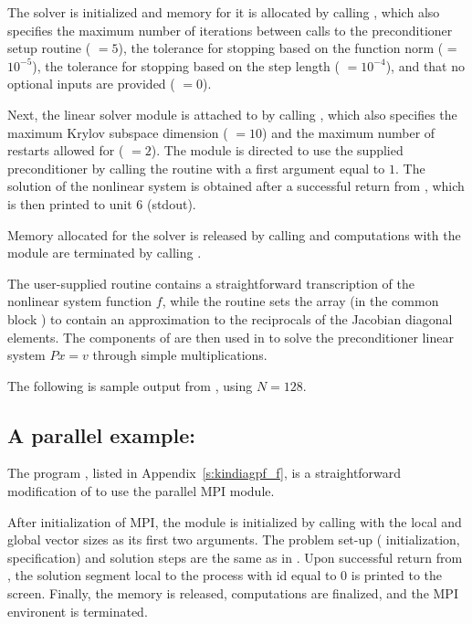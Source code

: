 The {\kinsol} solver is initialized and memory for it is allocated by
calling , which also specifies the maximum number of 
iterations between calls to the preconditioner setup routine ( $=5$),
the tolerance for stopping based on the function norm ( = $10^{-5}$),
the tolerance for stopping based on the step length ( $=10^{-4}$),
and that no optional inputs are provided ( $=0$).

Next, the {\kinspgmr} linear solver module is attached to {\kinsol} by calling
, which also specifies the maximum Krylov subspace dimension
( $=10$) and the maximum number of restarts allowed for {\spgmr}
( $=2$).  The {\kinspgmr} module is directed to use the supplied
preconditioner by  calling the  routine
with a first argument equal to $1$. The solution of the
nonlinear system is obtained after a successful return from , which
is then printed to unit 6 (stdout).

Memory allocated for the {\kinsol} solver is released by calling  and
computations with the {\nvecs} module are terminated by calling .

The user-supplied routine  contains a straightforward transcription
of the nonlinear system function $f$, while the routine  sets the
array  (in the common block ) to contain an approximation to 
the reciprocals of the Jacobian diagonal elements. The components of  are
then used in  to solve the preconditioner linear system $Px=v$
through simple multiplications.

The following is sample output from , using $N = 128$.



\subsection{A parallel example: }\label{ss:kindiagpf}

The program , listed in Appendix~\ref{s:kindiagpf_f}, is a
straightforward modification of  to use the parallel MPI
{\nvecp} module.

After initialization of MPI, the {\nvecp} module is initialized by calling
 with the local and global vector sizes as its first two
arguments.
The problem set-up ({\kinsol} initialization, {\kinspgmr} specification) and
solution steps are the same as in . 
Upon successful return from , the solution segment local to 
the process with id equal to $0$ is printed to the screen.
Finally, the {\kinsol} memory is released, {\nvecp} computations are 
finalized, and the MPI environent is terminated. 

